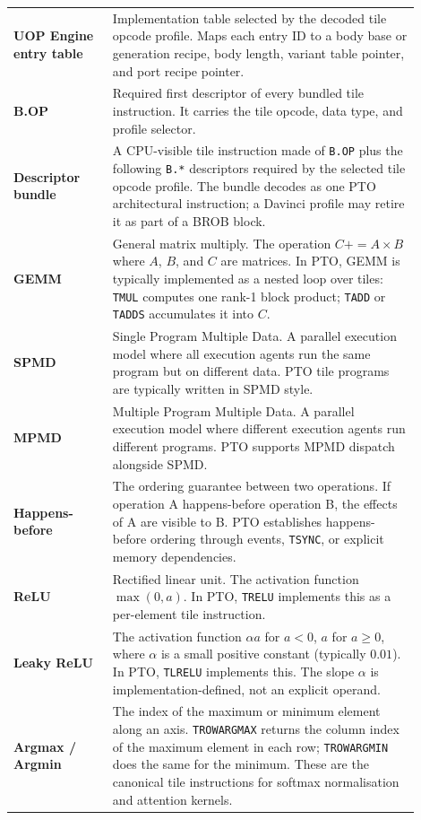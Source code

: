 \begin{longtable}{@{}L{0.22\linewidth}L{0.68\linewidth}@{}}
\textbf{UOP Engine entry table} & Implementation table selected by the decoded tile opcode profile. Maps each entry ID to a body base or generation recipe, body length, variant table pointer, and port recipe pointer. \\
\textbf{B.OP} & Required first descriptor of every bundled tile instruction. It carries the tile opcode, data type, and profile selector. \\
\textbf{Descriptor bundle} & A CPU-visible tile instruction made of \texttt{B.OP} plus the following \texttt{B.*} descriptors required by the selected tile opcode profile. The bundle decodes as one PTO architectural instruction; a Davinci profile may retire it as part of a BROB block. \\
\bottomrule


\textbf{GEMM} & General matrix multiply. The operation $C += A \times B$ where $A$, $B$, and $C$ are matrices. In PTO, GEMM is typically implemented as a nested loop over tiles: \texttt{TMUL} computes one rank-1 block product; \texttt{TADD} or \texttt{TADDS} accumulates it into $C$. \\
\textbf{SPMD} & Single Program Multiple Data. A parallel execution model where all execution agents run the same program but on different data. PTO tile programs are typically written in SPMD style. \\
\textbf{MPMD} & Multiple Program Multiple Data. A parallel execution model where different execution agents run different programs. PTO supports MPMD dispatch alongside SPMD. \\
\textbf{Happens-before} & The ordering guarantee between two operations. If operation A happens-before operation B, the effects of A are visible to B. PTO establishes happens-before ordering through events, \texttt{TSYNC}, or explicit memory dependencies. \\
\textbf{ReLU} & Rectified linear unit. The activation function $\max(0, a)$. In PTO, \texttt{TRELU} implements this as a per-element tile instruction. \\
\textbf{Leaky ReLU} & The activation function $\alpha a$ for $a < 0$, $a$ for $a \ge 0$, where $\alpha$ is a small positive constant (typically $0.01$). In PTO, \texttt{TLRELU} implements this. The slope $\alpha$ is implementation-defined, not an explicit operand. \\
\textbf{Argmax / Argmin} & The index of the maximum or minimum element along an axis. \texttt{TROWARGMAX} returns the column index of the maximum element in each row; \texttt{TROWARGMIN} does the same for the minimum. These are the canonical tile instructions for softmax normalisation and attention kernels. \\

\end{longtable}
